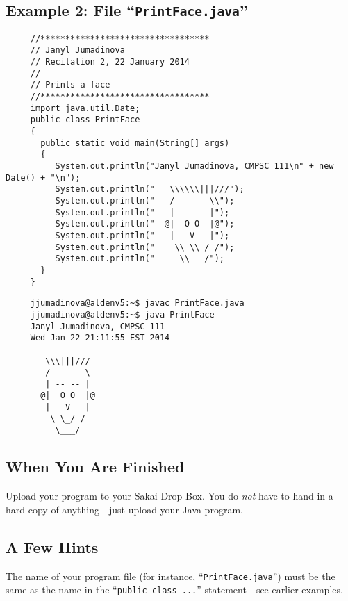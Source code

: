 \subsection*{Example 2: File ``{\tt PrintFace.java}''}
\begin{verbatim}
     //**********************************
     // Janyl Jumadinova
     // Recitation 2, 22 January 2014
     //
     // Prints a face
     //**********************************
     import java.util.Date;
     public class PrintFace
     {
       public static void main(String[] args)
       {
          System.out.println("Janyl Jumadinova, CMPSC 111\n" + new Date() + "\n");
          System.out.println("   \\\\\\|||///");
          System.out.println("   /       \\");
          System.out.println("   | -- -- |");
          System.out.println("  @|  O O  |@");
          System.out.println("   |   V   |");
          System.out.println("    \\ \\_/ /");
          System.out.println("     \\___/");
       }
     } 
\end{verbatim}
\begin{verbatim}
     jjumadinova@aldenv5:~$ javac PrintFace.java
     jjumadinova@aldenv5:~$ java PrintFace
     Janyl Jumadinova, CMPSC 111
     Wed Jan 22 21:11:55 EST 2014
     
        \\\|||///
        /       \
        | -- -- |
       @|  O O  |@
        |   V   |
         \ \_/ /
          \___/
\end{verbatim}

\subsection*{When You Are Finished}
Upload your program to your Sakai Drop Box. You do {\em not} have to
hand in a hard copy of anything---just upload your Java program.

\subsection*{A Few Hints}
The name of your program file (for instance, ``{\tt PrintFace.java}'')
must be the same as the name in the ``{\tt public class ...}''
statement---see earlier examples.

